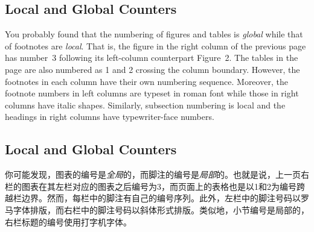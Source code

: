 \begin{paracol}{2}
\subsection{Local and Global Counters}

You probably found that the numbering of figures and tables is \emph{global}
while that of footnotes are \emph{local}.  That is, the figure in the right
column of the previous page has number~3 following its left-column
counterpart Figure~2.  The tables in the page are also numbered as 1 and 2
crossing the column boundary.  However, the footnotes in each column have
their own numbering sequence.  Moreover, the footnote numbers in left
columns are typeset in roman font while those in right columns have italic
shapes.  Similarly, subsection numbering is local and the headings in right
columns have typewriter-face numbers.
\switchcolumn
\subsection{Local and Global Counters}
你可能发现，图表的编号是\emph{全局}的，而脚注的编号是\emph{局部}的。也就是说，上一页右栏的图表在其左栏对应的图表之后编号为3，而页面上的表格也是以1和2为编号跨越栏边界。然而，每栏中的脚注有自己的编号序列。此外，左栏中的脚注号码以罗马字体排版，而右栏中的脚注号码以斜体形式排版。类似地，小节编号是局部的，右栏标题的编号使用打字机字体。


\end{paracol}
